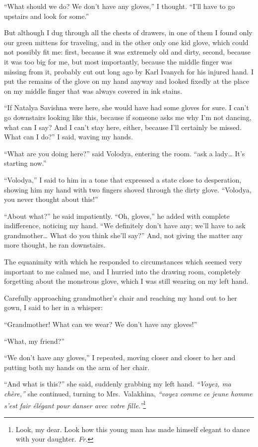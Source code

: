 ``What should we do? We don't have any gloves,'' I thought. ``I'll have to go upstairs and look for some.'' %

But although I dug through all the chests of drawers, in one of them I found only our green mittens for traveling, and in the other only one kid glove, which could not possibly fit me: first, because it was extremely old and dirty, second, because it was too big for me, but most importantly, because the middle finger was missing from it, probably cut out long ago by Karl Ivanych for his injured hand. I put the remains of the glove on my hand anyway and looked fixedly at the place on my middle finger that was always covered in ink stains.

``If Natalya Savishna were here, she would have had some gloves for sure. I can't go downstairs looking like this, because if someone asks me why I'm not dancing, what can I say? And I can't stay here, either, because I'll certainly be missed. What can I do?'' I said, waving my hands. %

``What are you doing here?'' said Volodya, entering the room. ``ask a lady\ldots{} It's starting now.'' %

``Volodya,'' I said to him in a tone that expressed a state close to desperation, showing him my hand with two fingers shoved through the dirty glove. ``Volodya, you never thought about this!'' %

``About what?'' he said impatiently. ``Oh, gloves,'' he added with complete indifference, noticing my hand. ``We definitely don't have any; we'll have to ask grandmother\ldots{} What do you think she'll say?'' And, not giving the matter any more thought, he ran downstairs. %

The equanimity with which he responded to circumstances which seemed very important to me calmed me, and I hurried into the drawing room, completely forgetting about the monstrous glove, which I was still wearing on my left hand.

Carefully approaching grandmother's chair and reaching my hand out to her gown, I said to her in a whisper:

``Grandmother! What can we wear? We don't have any gloves!'' %

``What, my friend?'' %

``We don't have any gloves,'' I repeated, moving closer and closer to her and putting both my hands on the arm of her chair.

``And what is this?'' she said, suddenly grabbing my left hand. \textit{``Voyez, ma ch\`ere,''} she continued, turning to Mrs.~Valakhina, \textit{``voyez comme ce jeune homme s'est fair \'el\'egant pour danser avec votre fille.''}\footnote{Look, my dear. Look how this young man has made himself elegant to dance with your daughter. \textit{Fr.}} %


